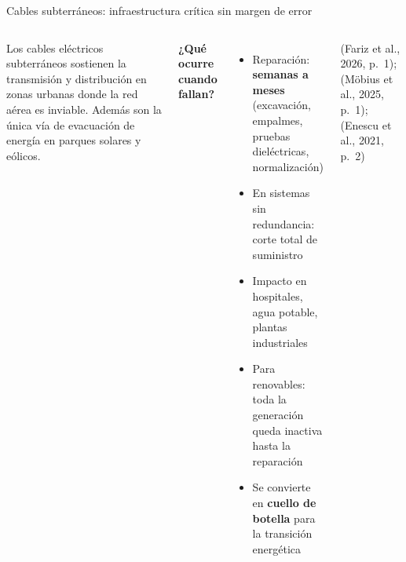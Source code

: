\documentclass[aspectratio=169]{beamer}
\newcommand{\refcite}[1]{{\footnotesize\color{gray!70!black} #1}}
\begin{document}
\begin{frame}{Cables subterráneos: infraestructura crítica sin margen de error}
\begin{columns}[T]
\justifying\small
Los cables eléctricos subterráneos sostienen la transmisión y distribución en
zonas urbanas donde la red aérea es inviable. Además son la única vía de
evacuación de energía en parques solares y eólicos.

\vspace{0.5em}
\textbf{¿Qué ocurre cuando fallan?}
\begin{itemize}[leftmargin=*]\small
    \item Reparación: \textbf{semanas a meses} (excavación, empalmes, pruebas
          dieléctricas, normalización)
    \item En sistemas sin redundancia: corte total de suministro
    \item Impacto en hospitales, agua potable, plantas industriales
    \item Para renovables: toda la generación queda inactiva hasta la
          reparación
    \item Se convierte en \textbf{cuello de botella} para la transición
          energética
\end{itemize}

\vspace{0.4em}
\refcite{(Fariz et al., 2026, p.~1); (Möbius et al., 2025, p.~1);
(Enescu et al., 2021, p.~2)}

\end{columns}
\end{frame}
\end{document}
